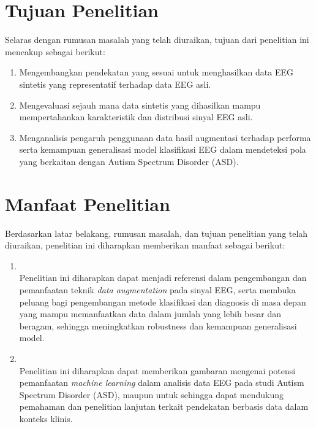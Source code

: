 \section{Tujuan Penelitian}
\label{sec:tujuan_penelitian}

Selaras dengan rumusan masalah yang telah diuraikan, tujuan dari penelitian ini mencakup sebagai berikut:

\begin{enumerate}
    \item Mengembangkan pendekatan yang sesuai untuk menghasilkan data EEG sintetis yang representatif terhadap data EEG asli.

    \item Mengevaluasi sejauh mana data sintetis yang dihasilkan mampu mempertahankan karakteristik dan distribusi sinyal EEG asli.

    \item Menganalisis pengaruh penggunaan data hasil augmentasi terhadap performa serta kemampuan generalisasi model klasifikasi EEG dalam mendeteksi pola yang berkaitan dengan Autism Spectrum Disorder (ASD).
\end{enumerate}

\section{Manfaat Penelitian}
\label{sec:manfaat_penelitian}
Berdasarkan latar belakang, rumusan masalah, dan tujuan penelitian yang telah diuraikan, penelitian ini diharapkan memberikan manfaat sebagai berikut:

\begin{enumerate}
    \item {} \\
    Penelitian ini diharapkan dapat menjadi referensi dalam pengembangan dan pemanfaatan teknik \textit{data augmentation} pada sinyal EEG, serta membuka peluang bagi pengembangan metode klasifikasi dan diagnosis di masa depan yang mampu memanfaatkan data dalam jumlah yang lebih besar dan beragam, sehingga meningkatkan robustness dan kemampuan generalisasi model.

    \item {} \\
    Penelitian ini diharapkan dapat memberikan gambaran mengenai potensi pemanfaatan \textit{machine learning} dalam analisis data EEG pada studi Autism Spectrum Disorder (ASD), maupun untuk  sehingga dapat mendukung pemahaman dan penelitian lanjutan terkait pendekatan berbasis data dalam konteks klinis.
\end{enumerate}


